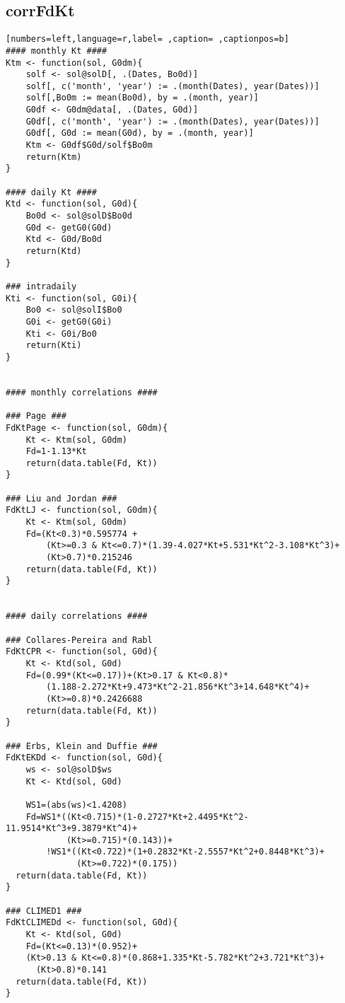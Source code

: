\subsection{corrFdKt}
\label{sec:orgdf385b5}
\begin{lstlisting}[numbers=left,language=r,label= ,caption= ,captionpos=b]
#### monthly Kt ####
Ktm <- function(sol, G0dm){
    solf <- sol@solD[, .(Dates, Bo0d)]
    solf[, c('month', 'year') := .(month(Dates), year(Dates))]
    solf[,Bo0m := mean(Bo0d), by = .(month, year)]
    G0df <- G0dm@data[, .(Dates, G0d)]
    G0df[, c('month', 'year') := .(month(Dates), year(Dates))]
    G0df[, G0d := mean(G0d), by = .(month, year)]
    Ktm <- G0df$G0d/solf$Bo0m
    return(Ktm)
}

#### daily Kt ####
Ktd <- function(sol, G0d){
    Bo0d <- sol@solD$Bo0d
    G0d <- getG0(G0d)
    Ktd <- G0d/Bo0d
    return(Ktd)
}

### intradaily
Kti <- function(sol, G0i){
    Bo0 <- sol@solI$Bo0
    G0i <- getG0(G0i)
    Kti <- G0i/Bo0
    return(Kti)
}


#### monthly correlations ####

### Page ###
FdKtPage <- function(sol, G0dm){
    Kt <- Ktm(sol, G0dm)
    Fd=1-1.13*Kt
    return(data.table(Fd, Kt))
}

### Liu and Jordan ###
FdKtLJ <- function(sol, G0dm){
    Kt <- Ktm(sol, G0dm)
    Fd=(Kt<0.3)*0.595774 +
        (Kt>=0.3 & Kt<=0.7)*(1.39-4.027*Kt+5.531*Kt^2-3.108*Kt^3)+
        (Kt>0.7)*0.215246
    return(data.table(Fd, Kt))
}


#### daily correlations ####

### Collares-Pereira and Rabl
FdKtCPR <- function(sol, G0d){
    Kt <- Ktd(sol, G0d)
    Fd=(0.99*(Kt<=0.17))+(Kt>0.17 & Kt<0.8)*
        (1.188-2.272*Kt+9.473*Kt^2-21.856*Kt^3+14.648*Kt^4)+
        (Kt>=0.8)*0.2426688      
    return(data.table(Fd, Kt))
}

### Erbs, Klein and Duffie ###
FdKtEKDd <- function(sol, G0d){
    ws <- sol@solD$ws
    Kt <- Ktd(sol, G0d)

    WS1=(abs(ws)<1.4208)
    Fd=WS1*((Kt<0.715)*(1-0.2727*Kt+2.4495*Kt^2-11.9514*Kt^3+9.3879*Kt^4)+
            (Kt>=0.715)*(0.143))+
        !WS1*((Kt<0.722)*(1+0.2832*Kt-2.5557*Kt^2+0.8448*Kt^3)+
              (Kt>=0.722)*(0.175))
  return(data.table(Fd, Kt))
}

### CLIMED1 ###
FdKtCLIMEDd <- function(sol, G0d){
    Kt <- Ktd(sol, G0d)
    Fd=(Kt<=0.13)*(0.952)+
    (Kt>0.13 & Kt<=0.8)*(0.868+1.335*Kt-5.782*Kt^2+3.721*Kt^3)+
      (Kt>0.8)*0.141
  return(data.table(Fd, Kt))
}


\end{lstlisting}

